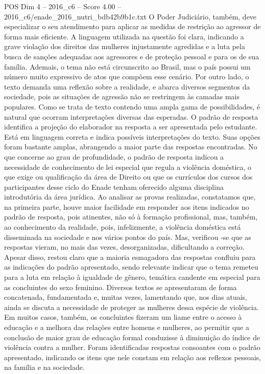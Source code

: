 \begin{textsample}{POS Dim 4 – 2016\_c6 – Score 4.00 – 2016\_c6/enade\_2016\_nutri\_bdb42b9b1c.txt}
O Poder Judiciário, também, deve especializar o seu atendimento para aplicar as medidas de restrição ao agressor de forma mais eficiente.
A linguagem utilizada na questão foi clara, indicando a grave violação dos direitos das mulheres injustamente agredidas e a luta pela busca de sanções adequadas aos agressores e de proteção pessoal e para os de sua família.
Ademais, o tema não está circunscrito ao Brasil, mas o país possui um número muito expressivo de atos que compõem esse cenário.
Por outro lado, o texto demanda uma reflexão sobre a realidade, e abarca diversos segmentos da sociedade, pois as situações de agressão não se restringem às camadas mais populares.
Como se trata de texto contendo uma ampla gama de possibilidades, é natural que ocorram interpretações diversas das esperadas.
O padrão de resposta identifica a projeção do elaborador na resposta a ser apresentada pelo estudante.
Está em linguagem correta e indica possíveis interpretações do texto.
Suas opções foram bastante amplas, abrangendo a maior parte das respostas encontradas.
No que concerne ao grau de profundidade, o padrão de resposta indicou a necessidade de conhecimento de lei especial que regula a violência doméstica, o que exige ou qualificação da área de Direito ou que os currículos dos cursos dos participantes desse ciclo do Enade tenham oferecido alguma disciplina introdutória da área jurídica.
Ao analisar as provas realizadas, constatamos que, na primeira parte, houve maior facilidade em responder aos itens indicados no padrão de resposta, pois atinentes, não só à formação profissional, mas, também, ao conhecimento da realidade, pois, infelizmente, a violência doméstica está disseminada na sociedade e nos vários pontos do país.
Mas, verificou -se que as respostas vieram, no mais das vezes, desorganizadas, dificultando a correção.
Apesar disso, restou claro que a maioria esmagadora das respostas confluiu para as indicações do padrão apresentado, sendo relevante indicar que o tema remeteu para a luta em relação à igualdade de gênero, temática candente em especial para as concluintes do sexo feminino.
Diversos textos se apresentaram de forma concatenada, fundamentada e, muitas vezes, lamentando que, nos dias atuais, ainda se discuta a necessidade de proteger as mulheres dessa espécie de violência.
Em muitos casos, também, os concluintes fizeram um liame entre o acesso à educação e a melhora das relações entre homens e mulheres, ao permitir que a conclusão de maior grau de educação formal conduzisse à diminuição do índice de violência contra a mulher.
Foram identificadas respostas consoantes com o padrão apresentado, indicando os itens que nele constam em relação aos reflexos pessoais, na família e na sociedade.

\end{textsample}
